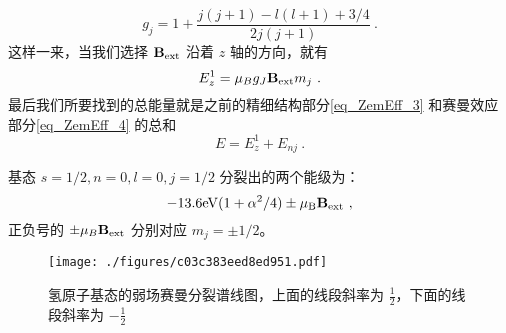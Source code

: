 \begin{equation}\label{eq_ZemEff_15}
g_j=1+\frac{j(j+1)-l(l+1)+3/4}{2j(j+1)}~.
\end{equation}
这样一来，当我们选择 $\mathbf{B}_{\rm{ext}}$ 沿着 $z$ 轴的方向，就有
\begin{equation}\label{eq_ZemEff_4}
E^1_z =\mu_Bg_J\mathbf{B}_{\rm{ext}}m_j~.
\end{equation}
最后我们所要找到的总能量就是之前的精细结构部分\autoref{eq_ZemEff_3} 和赛曼效应部分\autoref{eq_ZemEff_4} 的总和
\begin{equation}\label{eq_ZemEff_14}
E=E_z^1+E_{nj}~.
\end{equation}
\begin{example}{}
基态 $s=1/2,n=0,l=0,j=1/2$ 分裂出的两个能级为：
\begin{equation}\label{eq_ZemEff_16}
-13.6\rm{eV}(1+\alpha^2/4)\pm\mu_B\mathbf{B}_{\rm{ext}}\notag~,
\end{equation}
正负号的 $\pm\mu_B\mathbf{B}_{\rm{ext}}$ 分别对应 $m_j=\pm1/2$。\begin{figure}[ht]
\centering
\texttt{[image: ./figures/c03c383eed8ed951.pdf]}
\caption{氢原子基态的弱场赛曼分裂谱线图，上面的线段斜率为 $\frac{1}{2}$，下面的线段斜率为 $-\frac{1}{2}$} \label{fig_ZemEff_2}
\end{figure}
\end{example}

